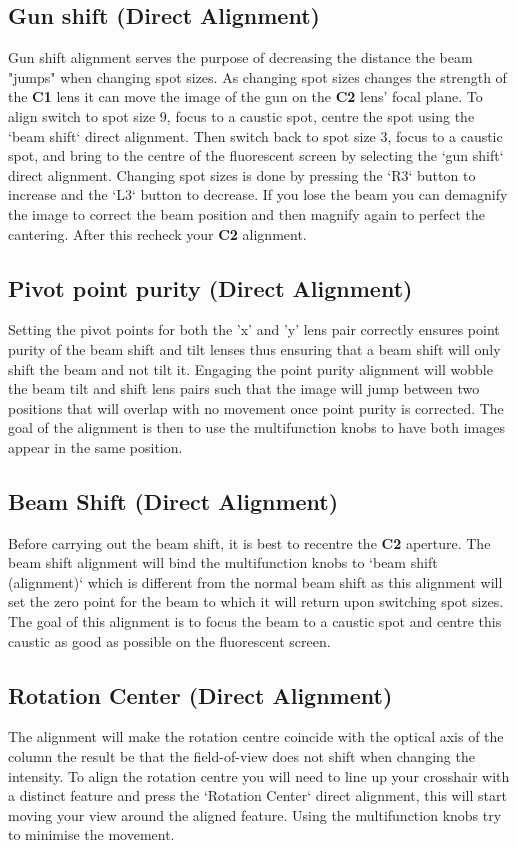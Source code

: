 \documentclass[a4paper]{scrartcl}
\begin{document}
\subsection*{Gun shift (Direct Alignment)}
Gun shift alignment serves the purpose of decreasing the distance the beam "jumps" when changing spot sizes. As changing spot sizes changes the strength of the \textbf{C1} lens it can move the image of the gun on the \textbf{C2} lens' focal plane. To align switch to spot size 9, focus to a caustic spot, centre the spot using the `beam shift` direct alignment. Then switch back to spot size 3, focus to a caustic spot, and bring to the centre of the fluorescent screen by selecting the `gun shift` direct alignment. Changing spot sizes is done by pressing the `R3` button to increase and the `L3` button to decrease. If you lose the beam you can demagnify the image to correct the beam position and then magnify again to perfect the cantering. After this recheck your \textbf{C2} alignment.

\subsection*{Pivot point purity (Direct Alignment)}
Setting the pivot points for both the 'x' and 'y' lens pair correctly ensures point purity of the beam shift and tilt lenses thus ensuring that a beam shift will only shift the beam and not tilt it. Engaging the point purity alignment will wobble the beam tilt and shift lens pairs such that the image will jump between two positions that will overlap with no movement once point purity is corrected. The goal of the alignment is then to use the multifunction knobs to have both images appear in the same position.

\subsection*{Beam Shift (Direct Alignment)}
Before carrying out the beam shift, it is best to recentre the \textbf{C2} aperture. The beam shift alignment will bind the multifunction knobs to `beam shift (alignment)` which is different from the normal beam shift as this alignment will set the zero point for the beam to which it will return upon switching spot sizes. The goal of this alignment is to focus the beam to a caustic spot and centre this caustic as good as possible on the fluorescent screen.

\subsection*{Rotation Center (Direct Alignment)}
The alignment will make the rotation centre coincide with the optical axis of the column the result be that the field-of-view does not shift when changing the intensity. To align the rotation centre you will need to line up your crosshair with a distinct feature and press the `Rotation Center` direct alignment, this will start moving your view around the aligned feature. Using the multifunction knobs try to minimise the movement.
\end{document}
